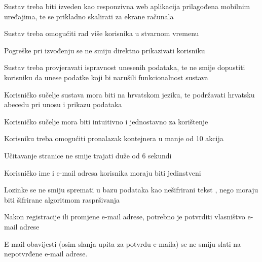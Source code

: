 			\begin{packed_item}
				\item Sustav treba biti izveden kao responzivna web aplikacija prilagođena mobilnim uređajima, te se prikladno skalirati za ekrane računala
				\item Sustav treba omogućiti rad više korisnika u stvarnom vremenu
				\item Pogreške pri izvođenju se ne smiju direktno prikazivati korisniku
				\item Sustav treba provjeravati ispravnost unesenih podataka, te ne smije dopustiti korisniku da unese podatke koji bi narušili funkcionalnost sustava
				\item Korisničko sučelje sustava mora biti na hrvatskom jeziku, te podržavati hrvatsku abecedu pri unosu i prikazu podataka
				\item Korisničko sučelje mora biti intuitivno i jednostavno za korištenje
				\item Korisniku treba omogućiti pronalazak kontejnera u manje od 10 akcija
				\item Učitavanje stranice ne smije trajati duže od 6 sekundi
				\\
				\item Korisničko ime i e-mail adresa korisnika moraju biti jedinstveni
				\item Lozinke se ne smiju spremati u bazu podataka kao nešifrirani tekst , nego moraju biti šifrirane algoritmom raspršivanja
				\item Nakon registracije ili promjene e-mail adrese, potrebno je potvrditi vlasništvo e-mail adrese
				\item E-mail obavijesti (osim slanja upita za potvrdu e-maila) se ne smiju slati na nepotvrđene e-mail adrese.
			\end{packed_item}
			
			
			\clearpage
